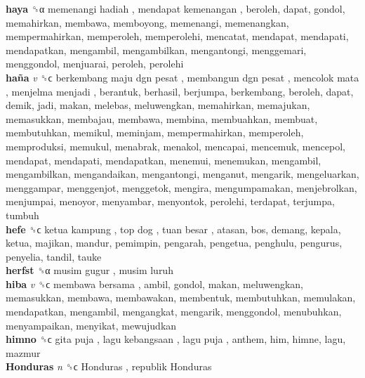 \textbf{haya} ␝α   memenangi hadiah ,  mendapat kemenangan , beroleh, dapat, gondol, memahirkan, membawa, memboyong, memenangi, memenangkan, mempermahirkan, memperoleh, memperolehi, mencatat, mendapat, mendapati, mendapatkan, mengambil, mengambilkan, mengantongi, menggemari, menggondol, menjuarai, peroleh, perolehi  \\
\textbf{haña} \emph{v}  ␝ϲ   berkembang maju dgn pesat ,  membangun dgn pesat ,  mencolok mata ,  menjelma menjadi , berantuk, berhasil, berjumpa, berkembang, beroleh, dapat, demik, jadi, makan, melebas, meluwengkan, memahirkan, memajukan, memasukkan, membajau, membawa, membina, membuahkan, membuat, membutuhkan, memikul, meminjam, mempermahirkan, memperoleh, memproduksi, memukul, menabrak, menakol, mencapai, mencemuk, mencepol, mendapat, mendapati, mendapatkan, menemui, menemukan, mengambil, mengambilkan, mengandaikan, mengantongi, menganut, mengarik, mengeluarkan, menggampar, menggenjot, menggetok, mengira, mengumpamakan, menjebrolkan, menjumpai, menoyor, menyambar, menyontok, perolehi, terdapat, terjumpa, tumbuh  \\
\textbf{hefe} ␝ϲ   ketua kampung ,  top dog ,  tuan besar , atasan, bos, demang, kepala, ketua, majikan, mandur, pemimpin, pengarah, pengetua, penghulu, pengurus, penyelia, tandil, tauke  \\
\textbf{herfst} ␝α   musim gugur ,  musim luruh   \\
\textbf{hiba} \emph{v}  ␝ϲ   membawa bersama , ambil, gondol, makan, meluwengkan, memasukkan, membawa, membawakan, membentuk, membutuhkan, memulakan, mendapatkan, mengambil, mengangkat, mengarik, menggondol, menubuhkan, menyampaikan, menyikat, mewujudkan  \\
\textbf{himno} ␝ϲ   gita puja ,  lagu kebangsaan ,  lagu puja , anthem, him, himne, lagu, mazmur  \\
\textbf{Honduras} \emph{n}  ␝ϲ   Honduras ,  republik Honduras   \\
